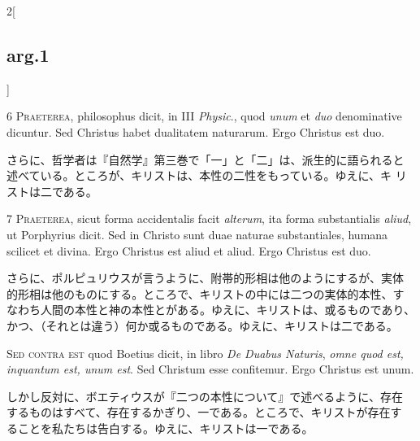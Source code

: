 \documentclass[paper=a4paper,fontsize=10pt,jafontsize=9pt,titlepage]{jlreq}
\begin{document}
\begin{paracol}{2}[\subsection{arg.1}]

{\scshape 6 Praeterea}, philosophus dicit, in III
 {\itshape Physic}., quod {\itshape unum} et {\itshape duo} denominative dicuntur. Sed Christus habet
 dualitatem naturarum. Ergo Christus est duo.

\switchcolumn

さらに、哲学者は『自然学』第三巻で「一」と「二」は、派生的に語られると
述べている。ところが、キリストは、本性の二性をもっている。ゆえに、キ
リストは二である。


{\scshape 7 Praeterea}, sicut forma accidentalis facit
 {\itshape alterum}, ita forma substantialis {\itshape aliud}, ut Porphyrius dicit. Sed in
 Christo sunt duae naturae substantiales, humana scilicet et
 divina. Ergo Christus est aliud et aliud. Ergo Christus est duo.

\switchcolumn

さらに、ポルピュリウスが言うように、附帯的形相は他のようにするが、実体
的形相は他のものにする。ところで、キリストの中には二つの実体的本性、す
なわち人間の本性と神の本性とがある。ゆえに、キリストは、或るものであり、
かつ、（それとは違う）何か或るものである。ゆえに、キリストは二である。

\switchcolumn*[\subsection{s.c.}]

{\scshape Sed contra est} quod Boetius dicit, in
 libro {\itshape De Duabus Naturis}, {\itshape omne quod est, inquantum est, unum est}. Sed
 Christum esse confitemur. Ergo Christus est unum.

\switchcolumn

しかし反対に、ボエティウスが『二つの本性について』で述べるように、存在
するものはすべて、存在するかぎり、一である。ところで、キリストが存在す
ることを私たちは告白する。ゆえに、キリストは一である。



\end{paracol}
\end{document}
